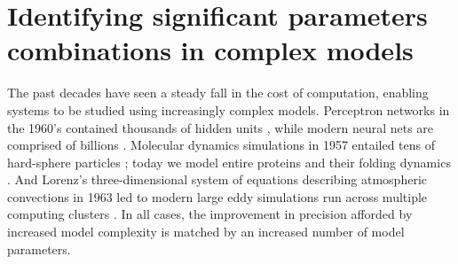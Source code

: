 \chapter{Identifying significant parameters combinations in complex
  models \label{ch:params}}




The past decades have seen a steady fall in the cost of computation,
enabling systems to be studied using increasingly complex models.
Perceptron networks in the 1960's contained thousands of hidden units
\cite{Neural networks-then and now}, while modern neural nets are
comprised of billions \cite{Biggest Neural Network Ever Pushes AI Deep
  Learning}. Molecular dynamics simulations in 1957 entailed tens of
hard-sphere particles \cite{Phase Transition for a Hard Sphere
  System}; today we model entire proteins and their folding dynamics
\cite{Atomic-level description of ubiquitin folding}. And Lorenz's
three-dimensional system of equations describing atmospheric
convections in 1963 \cite{Deterministic Nonperiodic Flow} led to
modern large eddy simulations run across multiple computing clusters
\cite{A dynamic localization model for large-eddy simulation of
  turbulent flows}. In all cases, the improvement in precision
afforded by increased model complexity is matched by an increased
number of model parameters.

